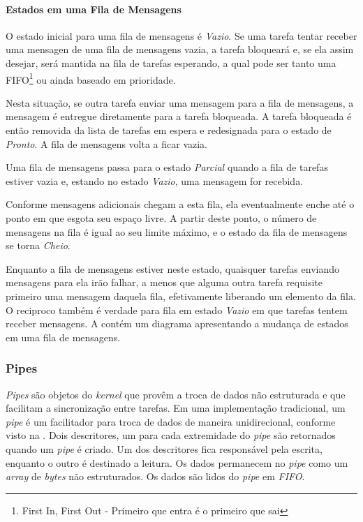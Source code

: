 
\paragraph{Estados em uma Fila de Mensagens}

O estado inicial para uma fila de mensagens é \emph{Vazio}. Se uma tarefa tentar receber uma mensagen de uma fila de mensagens vazia, a tarefa bloqueará e, se ela assim desejar, será mantida na fila de tarefas esperando, a qual pode ser tanto uma FIFO\footnote{First In, First Out - Primeiro que entra é o primeiro que sai} ou ainda baseado em prioridade.

Nesta situação, se outra tarefa enviar uma mensagem para a fila de mensagens, a mensagem é entregue diretamente para a tarefa bloqueada. A tarefa bloqueada é então removida da lista de tarefas em espera e redesignada para o estado de \emph{Pronto}. A fila de mensagens volta a ficar vazia.

Uma fila de mensagens passa para o estado \emph{Parcial} quando a fila de tarefas estiver vazia e, estando no estado \emph{Vazio}, uma mensagem for recebida.

Conforme mensagens adicionais chegam a esta fila, ela eventualmente enche até o ponto em que esgota seu espaço livre. A partir deste ponto, o número de mensagens na fila é igual ao seu limite máximo, e o estado da fila de mensagens se torna \emph{Cheio}. 

Enquanto a fila de mensagens estiver neste estado, quaisquer tarefas enviando mensagens para ela irão falhar, a menos que alguma outra tarefa requisite primeiro uma mensagem daquela fila, efetivamente liberando um elemento da fila. O reciproco também é verdade para fila em estado \emph{Vazio} em que tarefas tentem receber mensagens. A  contém um diagrama apresentando a mudança de estados em uma fila de mensagens.


\subsubsection{Pipes}

\emph{Pipes} são objetos do \emph{kernel} que provêm a troca de dados não estruturada e que facilitam a sincronização entre tarefas. Em uma implementação tradicional, um \emph{pipe} é um facilitador para troca de dados de maneira unidirecional, conforme visto na . Dois descritores, um para cada extremidade do \emph{pipe} são retornados quando um \emph{pipe} é criado. Um dos descritores fica responsável pela escrita, enquanto o outro é destinado a leitura. Os dados permanecem no \emph{pipe} como um \emph{array} de \emph{bytes} não estruturados. Os dados são lidos do \emph{pipe} em \emph{FIFO}.

